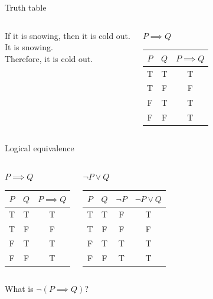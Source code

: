 \documentclass [aspectratio=169]{beamer}
\begin{document}
\begin{frame}{Truth table}
    \begin{columns}
        \begin{center}
If it is snowing, then it is cold out. \\
It is snowing. \\
Therefore, it is cold out. 
\end{center}
\pause
        \begin{center}
        $P \implies Q$ \\
        \vspace{1.5em}
        \begin{tabular}{|c|c| c|}
\hline
     $P$& $Q$ &  $P \implies Q$ \\ \hline
     T& T & T \\ \hline
     T & F & F \\ \hline
     F & T & T \\ \hline
     F & F & T \\ \hline
\end{tabular}
\end{center}
\end{columns}
\end{frame}


\begin{frame}{Logical equivalence}
    \begin{columns}
        \begin{center}
        $P \implies Q$ \\
        \vspace{1.5em}
\begin{tabular}{|c|c| c|}
\hline
     $P$& $Q$ &  $P \implies Q$ \\ \hline
     T& T & T \\ \hline
     T & F & F \\ \hline
     F & T & T \\ \hline
     F & F & T \\ \hline
\end{tabular}
\end{center}
\pause
        \begin{center}
        $\neg P \vee Q$ \\
        \vspace{1.5em}
        \begin{tabular}{|c | c | c | c|}
\hline
     $P$& $Q$ & $\neg P$ & $\neg P \vee Q$  \\ \hline
     T& T & F & T \\ \hline
     T & F & F & F \\ \hline
     F & T &  T &T \\ \hline
     F & F & T & T \\ \hline
\end{tabular}
\end{center}
\end{columns}
\vspace{2em}
\pause
\centering
What is $\neg (P \implies Q)$?
\end{frame}
\end{document}
